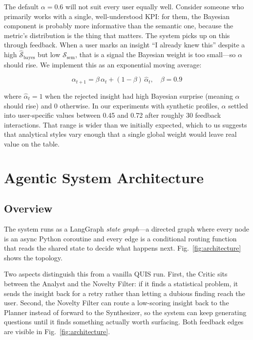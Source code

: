 \documentclass[conference]{IEEEtran}
\begin{document}
The default $\alpha = 0.6$ will not suit every user equally well.
Consider someone who primarily works with a single, well-understood
KPI: for them, the Bayesian component is probably more informative
than the semantic one, because the metric's distribution is the thing
that matters. The system picks up on this through feedback. When a
user marks an insight ``I already knew this'' despite a high
$\hat{\mathcal{S}}_{\text{bayes}}$ but low $\mathcal{S}_{\text{sem}}$,
that is a signal the Bayesian weight is too small---so $\alpha$ should
rise. We implement this as an exponential moving average:

\begin{equation}
  \alpha_{t+1} = \beta\,\alpha_t + (1 - \beta)\,\hat{\alpha}_t,
  \quad \beta = 0.9
  \label{eq:alpha_update}
\end{equation}

where $\hat{\alpha}_t = 1$ when the rejected insight had high
Bayesian surprise (meaning $\alpha$ should rise) and 0 otherwise.
In our experiments with synthetic profiles, $\alpha$ settled into
user-specific values between 0.45 and 0.72 after roughly
30 feedback interactions. That range is wider than we initially
expected, which to us suggests that analytical styles vary enough
that a single global weight would leave real value on the table.

\section{Agentic System Architecture}
\label{sec:arch}

\subsection{Overview}

The system runs as a LangGraph \emph{state graph}---a directed graph
where every node is an async Python coroutine and every edge is a
conditional routing function that reads the shared state to decide
what happens next. Fig.~\ref{fig:architecture} shows the topology.

Two aspects distinguish this from a vanilla QUIS run. First, the
Critic sits between the Analyst and the Novelty Filter: if it finds
a statistical problem, it sends the insight back for a retry rather
than letting a dubious finding reach the user. Second, the Novelty
Filter can route a low-scoring insight back to the Planner instead
of forward to the Synthesizer, so the system can keep generating
questions until it finds something actually worth surfacing. Both
feedback edges are visible in Fig.~\ref{fig:architecture}.
\end{document}
